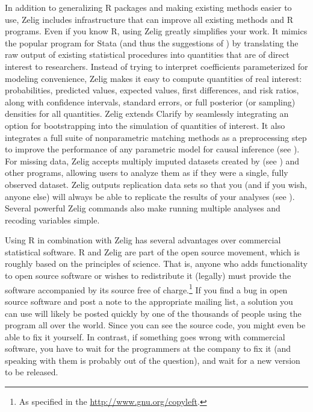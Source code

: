 \documentclass{article}
\begin{document}
In addition to generalizing R packages and making existing methods
easier to use, Zelig includes infrastructure that can improve all
existing methods and R programs.  Even if you know R, using Zelig
greatly simplifies your work.  It mimics the popular
 program
for Stata (and thus the suggestions of )
\nocite{KinTomWit00} by translating the raw output of existing statistical
procedures into quantities that are of direct
interest to researchers.  Instead of trying to interpret coefficients
parameterized for modeling convenience, Zelig makes it easy to compute
quantities of real interest: probabilities, predicted values, expected
values, first differences, and risk ratios, along with confidence
intervals, standard errors, or full posterior (or sampling) densities
for all quantities.  Zelig extends Clarify by seamlessly integrating
an option for bootstrapping into the simulation of quantities of
interest.  It also integrates a full suite of nonparametric matching
methods as a preprocessing step to improve the performance of any
parametric model for causal inference (see
).  For missing data,
Zelig accepts multiply imputed datasets created by
 (see
)\nocite{KinHonJos01}
and other programs, allowing users to analyze them as if they were a
single, fully observed dataset.  Zelig outputs replication data sets
so that you (and if you wish, anyone else) will always be able to
replicate the results of your analyses (see ).\nocite{King95}
Several powerful Zelig commands also make running multiple analyses
and recoding variables simple.

Using R in combination with Zelig has several advantages over
commercial statistical software.  R and Zelig are part of the open
source movement, which is roughly based on the principles of science.
That is, anyone who adds functionality to open source software or
wishes to redistribute it (legally) must provide the software
accompanied by its source free of charge.\footnote{As specified in the
  \url{http://www.gnu.org/copyleft}.}  If you find a bug in open
source software and post a note to the appropriate mailing list, a
solution you can use will likely be posted quickly by one of the
thousands of people using the program all over the world.  Since you
can see the source code, you might even be able to fix it yourself.
In contrast, if something goes wrong with commercial software, you
have to wait for the programmers at the company to fix it (and
speaking with them is probably out of the question), and wait for a
new version to be released.
\end{document}
